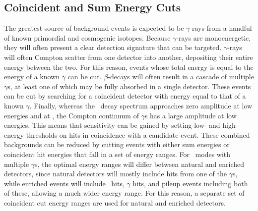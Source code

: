 \documentclass[/main.tex]{subfiles}
\begin{document}
\subsection{Coincident and Sum Energy Cuts} \label{sec:MSenergycuts}
The greatest source of background events is expected to be $\gamma$-rays from a handful of known primordial and cosmogenic isotopes.
Because $\gamma$-rays are monoenergetic, they will often present a clear detection signature that can be targeted.
$\gamma$-rays will often Compton scatter from one detector into another, depositing their entire energy between the two.
For this reason, events whose total energy is equal to the energy of a known $\gamma$ can be cut.
$\beta$-decays will often result in a cascade of multiple $\gamma$s, at least one of which may be fully absorbed in a single detector.
These events can be cut by searching for a coincident detector with energy equal to that of a known $\gamma$.
Finally, whereas the \bb\ decay spectrum approaches zero amplitude at low energies and at \Qbb, the Compton continuum of $\gamma$s has a large amplitude at low energies.
This means that sensitivity can be gained by setting low- and high-energy thresholds on hits in coincidence with a candidate event.
These combined backgrounds can be reduced by cutting events with either sum energies or coincident hit energies that fall in a set of energy ranges.
For \bbes\ modes with multiple $\gamma$s, the optimal energy ranges will differ between natural and enriched detectors, since natural detectors will mostly include hits from one of the $\gamma$s, while enriched events will include \bb\ hits, $\gamma$ hits, and pileup events including both of these, allowing a much wider energy range.
For this reason, a separate set of coincident cut energy ranges are used for natural and enriched detectors.
\end{document}
